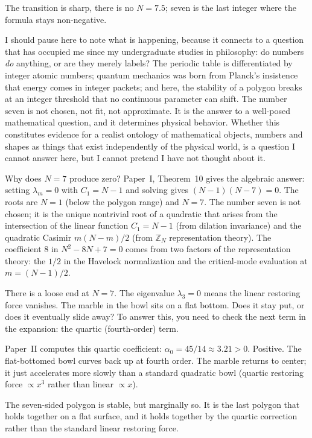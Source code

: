 The transition is sharp, there is no $N = 7.5$; seven is the last
integer where the formula stays non-negative.

I should pause here to note what is happening, because it connects to
a question that has occupied me since my undergraduate studies in
philosophy: do numbers \emph{do} anything, or are they merely labels?
The periodic table is differentiated by integer atomic numbers;
quantum mechanics was born from Planck's insistence that energy comes
in integer packets; and here, the stability of a polygon breaks at
an integer threshold that no continuous parameter can shift. The
number seven is not chosen, not fit, not approximate. It is the
answer to a well-posed mathematical question, and it determines
physical behavior. Whether this constitutes evidence for a realist
ontology of mathematical objects, numbers and shapes as things that
exist independently of the physical world, is a question I cannot
answer here, but I cannot pretend I have not thought about it.

Why does $N = 7$ produce zero? Paper~I, Theorem~10 gives the algebraic
answer: setting $\lambda_m = 0$ with $C_1 = N - 1$ and solving gives
$(N - 1)(N - 7) = 0$. The roots are $N = 1$ (below the polygon range)
and $N = 7$. The number seven is not chosen; it is the unique
nontrivial root of a quadratic that arises from the intersection of
the linear function $C_1 = N - 1$ (from dilation invariance) and the
quadratic Casimir $m(N-m)/2$ (from $\mathbb{Z}_N$ representation
theory). The coefficient $8$ in $N^2 - 8N + 7 = 0$ comes from two
factors of the representation theory: the $1/2$ in the Havelock
normalization and the critical-mode evaluation at $m = (N-1)/2$.

There is a loose end at $N = 7$. The eigenvalue $\lambda_3 = 0$ means
the linear restoring force vanishes. The marble in the bowl sits on a
flat bottom. Does it stay put, or does it eventually slide away? To
answer this, you need to check the next term in the expansion: the
quartic (fourth-order) term.

Paper~II computes this quartic coefficient:
$\alpha_0 = 45/14 \approx 3.21 > 0$. Positive. The flat-bottomed
bowl curves back up at fourth order. The marble returns to center; it
just accelerates more slowly than a standard quadratic bowl (quartic
restoring force $\propto x^3$ rather than linear $\propto x$).

The seven-sided polygon is stable, but marginally so. It is the last
polygon that holds together on a flat surface, and it holds together
by the quartic correction rather than the standard linear restoring
force.

